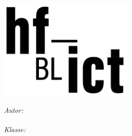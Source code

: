 

\begin{titlepage}

\setlength{\parskip}{0pt}

\begin{center}
\includegraphics[width=0.5\textwidth]{Bilder/hf-ict-Logo}

\vspace{0.5cm}
{\color{black}\LARGE \univnameger\par}
\vspace{0.3cm}

\vspace{1.5cm}

{\LARGE \ttype\par}
\vspace{0.2cm}
\HRule 
\vspace{0.2cm}

{\huge \bfseries \ttitle\par}
\vspace{0.2cm}
\HRule
\vspace{1.0cm}

\begin{minipage}[t]{0.4\textwidth}
\begin{flushleft}
    \large
    \emph{Autor:} \\
    \authorname \\
    \vspace{0.5cm}
    \emph{Klasse:} \\
    \authcls
\end{flushleft}
\end{minipage}


\end{center}
\end{titlepage}
